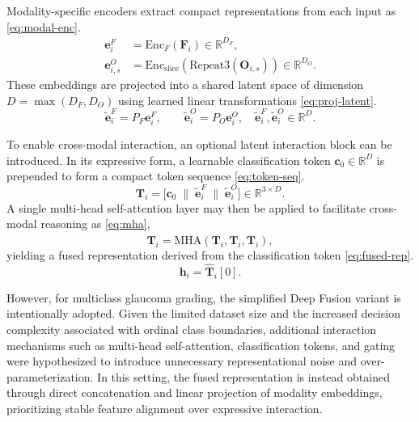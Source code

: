 \documentclass[preprint,12pt]{elsarticle}
\newcommand{\eqrefp}[1]{\eqref{#1}}
\begin{document}
Modality-specific encoders extract compact representations from each input as \eqrefp{eq:modal-enc}.
\begin{equation}
    \begin{aligned}
        \mathbf{e}_i^{F}
         & = \mathrm{Enc}_F(\mathbf{F}_i)
        \in \mathbb{R}^{D_F},                    \\
        \mathbf{e}_{i,s}^{O}
         & = \mathrm{Enc}_{\text{slice}}\!\left(
        \mathrm{Repeat3}(\mathbf{O}_{i,s})
        \right)
        \in \mathbb{R}^{D_O}.
    \end{aligned}
    \label{eq:modal-enc}
\end{equation}
These embeddings are projected into a shared latent space of dimension
$D = \max(D_F, D_O)$
using learned linear transformations \eqrefp{eq:proj-latent}.
\begin{equation}
    \tilde{\mathbf{e}}_i^{F} = P_F \mathbf{e}_i^{F},
    \qquad
    \tilde{\mathbf{e}}_i^{O} = P_O \mathbf{e}_i^{O},
    \quad
    \tilde{\mathbf{e}}_i^{F}, \tilde{\mathbf{e}}_i^{O} \in \mathbb{R}^{D}.
    \label{eq:proj-latent}
\end{equation}

To enable cross-modal interaction, an optional latent interaction block can be introduced. In its expressive form, a learnable classification token
$\mathbf{c}_0 \in \mathbb{R}^{D}$
is prepended to form a compact token sequence \eqrefp{eq:token-seq}.
\begin{equation}
    \mathbf{T}_i =
    \bigl[
    \mathbf{c}_0 \;\|\;
    \tilde{\mathbf{e}}_i^{F} \;\|\;
    \tilde{\mathbf{e}}_i^{O}
    \bigr]
    \in \mathbb{R}^{3 \times D}.
    \label{eq:token-seq}
\end{equation}
A single multi-head self-attention layer may then be applied to facilitate cross-modal reasoning as \eqrefp{eq:mha},
\begin{equation}
    \hat{\mathbf{T}}_i = \mathrm{MHA}(\mathbf{T}_i, \mathbf{T}_i, \mathbf{T}_i),
    \label{eq:mha}
\end{equation}
yielding a fused representation derived from the classification token \eqrefp{eq:fused-rep}.
\begin{equation}
    \mathbf{h}_i = \hat{\mathbf{T}}_i[0].
    \label{eq:fused-rep}
\end{equation}

However, for multiclass glaucoma grading, the simplified Deep Fusion variant is intentionally adopted. Given the limited dataset size and the increased decision complexity associated with ordinal class boundaries, additional interaction mechanisms such as multi-head self-attention, classification tokens, and gating were hypothesized to introduce unnecessary representational noise and over-parameterization. In this setting, the fused representation is instead obtained through direct concatenation and linear projection of modality embeddings, prioritizing stable feature alignment over expressive interaction.
\end{document}
